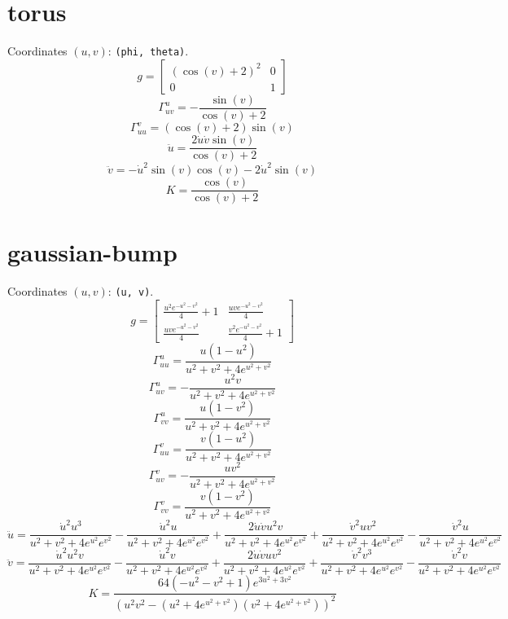 \documentclass{article}
\begin{document}
\section*{torus}
Coordinates $(u, v)$: \texttt{(phi, theta)}.
\[ g = \left[\begin{matrix}\left(\cos{\left(v \right)} + 2\right)^{2} & 0\\0 & 1\end{matrix}\right] \]
\[ \Gamma^{u}_{uv} = - \frac{\sin{\left(v \right)}}{\cos{\left(v \right)} + 2} \]
\[ \Gamma^{v}_{uu} = \left(\cos{\left(v \right)} + 2\right) \sin{\left(v \right)} \]
\[ \ddot{u} = \frac{2 \dot{u} \dot{v} \sin{\left(v \right)}}{\cos{\left(v \right)} + 2} \]
\[ \ddot{v} = - \dot{u}^{2} \sin{\left(v \right)} \cos{\left(v \right)} - 2 \dot{u}^{2} \sin{\left(v \right)} \]
\[ K = \frac{\cos{\left(v \right)}}{\cos{\left(v \right)} + 2} \]

\section*{gaussian-bump}
Coordinates $(u, v)$: \texttt{(u, v)}.
\[ g = \left[\begin{matrix}\frac{u^{2} e^{- u^{2} - v^{2}}}{4} + 1 & \frac{u v e^{- u^{2} - v^{2}}}{4}\\\frac{u v e^{- u^{2} - v^{2}}}{4} & \frac{v^{2} e^{- u^{2} - v^{2}}}{4} + 1\end{matrix}\right] \]
\[ \Gamma^{u}_{uu} = \frac{u \left(1 - u^{2}\right)}{u^{2} + v^{2} + 4 e^{u^{2} + v^{2}}} \]
\[ \Gamma^{u}_{uv} = - \frac{u^{2} v}{u^{2} + v^{2} + 4 e^{u^{2} + v^{2}}} \]
\[ \Gamma^{u}_{vv} = \frac{u \left(1 - v^{2}\right)}{u^{2} + v^{2} + 4 e^{u^{2} + v^{2}}} \]
\[ \Gamma^{v}_{uu} = \frac{v \left(1 - u^{2}\right)}{u^{2} + v^{2} + 4 e^{u^{2} + v^{2}}} \]
\[ \Gamma^{v}_{uv} = - \frac{u v^{2}}{u^{2} + v^{2} + 4 e^{u^{2} + v^{2}}} \]
\[ \Gamma^{v}_{vv} = \frac{v \left(1 - v^{2}\right)}{u^{2} + v^{2} + 4 e^{u^{2} + v^{2}}} \]
\[ \ddot{u} = \frac{\dot{u}^{2} u^{3}}{u^{2} + v^{2} + 4 e^{u^{2}} e^{v^{2}}} - \frac{\dot{u}^{2} u}{u^{2} + v^{2} + 4 e^{u^{2}} e^{v^{2}}} + \frac{2 \dot{u} \dot{v} u^{2} v}{u^{2} + v^{2} + 4 e^{u^{2}} e^{v^{2}}} + \frac{\dot{v}^{2} u v^{2}}{u^{2} + v^{2} + 4 e^{u^{2}} e^{v^{2}}} - \frac{\dot{v}^{2} u}{u^{2} + v^{2} + 4 e^{u^{2}} e^{v^{2}}} \]
\[ \ddot{v} = \frac{\dot{u}^{2} u^{2} v}{u^{2} + v^{2} + 4 e^{u^{2}} e^{v^{2}}} - \frac{\dot{u}^{2} v}{u^{2} + v^{2} + 4 e^{u^{2}} e^{v^{2}}} + \frac{2 \dot{u} \dot{v} u v^{2}}{u^{2} + v^{2} + 4 e^{u^{2}} e^{v^{2}}} + \frac{\dot{v}^{2} v^{3}}{u^{2} + v^{2} + 4 e^{u^{2}} e^{v^{2}}} - \frac{\dot{v}^{2} v}{u^{2} + v^{2} + 4 e^{u^{2}} e^{v^{2}}} \]
\[ K = \frac{64 \left(- u^{2} - v^{2} + 1\right) e^{3 u^{2} + 3 v^{2}}}{\left(u^{2} v^{2} - \left(u^{2} + 4 e^{u^{2} + v^{2}}\right) \left(v^{2} + 4 e^{u^{2} + v^{2}}\right)\right)^{2}} \]
\end{document}
